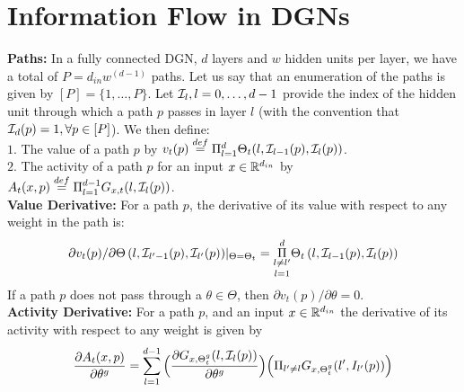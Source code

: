 \section{Information Flow in DGNs}\label{sec:expressivity}
\textbf{Paths:} In a fully connected DGN, $d$ layers and $w$ hidden units per layer, we have a total of $P=d_{in}w^{(d-1)}$ paths. Let us say that an enumeration of the paths is given by $[P]=\{1,\ldots,P\}$. Let $\mathcal{I}_{l},l=0,\ldots,d-1$ provide the index of the hidden unit through which a path $p$ passes in layer $l$ (with the convention that $\mathcal{I}_d(p)=1,\forall p\in [P]$). We then define:\\
$1.$ The value of a path $p$ by $v_t(p)\stackrel{def}=\Pi_{l=1}^d \Theta_t(l,\mathcal{I}_{l-1}(p),\mathcal{I}_l(p))$.\\
$2.$ The activity of a path $p$ for an input $x\in \mathbb{R}^{d_{in}}$ by $A_{t}(x,p)\stackrel{def}{=}\Pi_{l=1}^{d-1} G_{x,t}(l,\mathcal{I}_l(p))$.\\
\textbf{Value Derivative:} For a path $p$, the derivative of its value with respect to any weight in the path is: 
\begin{align}\label{eq:vft}{\partial v_t(p)}/{\partial \Theta\left(l,\mathcal{I}_{l'-1}(p),\mathcal{I}_{l'}(p)\right)}|_{\Theta=\Theta_t}= \underset{l=1}{\underset{l\neq l'}{\overset{d}{\Pi}}} \Theta_t\left(l,\mathcal{I}_{l-1}(p),\mathcal{I}_{l}(p)\right)
\end{align}
If a path $p$ does not pass through a $\theta\in\Theta$, then ${\partial v_t(p)}/{\partial \theta}=0$.\\
\textbf{Activity Derivative:} For a path $p$, and an input $x\in\mathbb{R}^{d_{in}}$ the derivative of its activity with respect to any weight is given by 
\begin{align}
\frac{\partial A_{t}(x,p)}{\partial \theta^g}= \sum_{l=1}^{d-1} \Big(\frac{\partial G_{x,{\Theta}^g_t}(l,\mathcal{I}_l(p))}{\partial \theta^g} \Big)\Big(\Pi_{l'\neq l} G_{x,{\Theta}^g_t}(l',I_{l'}(p))\Big)
\end{align}
